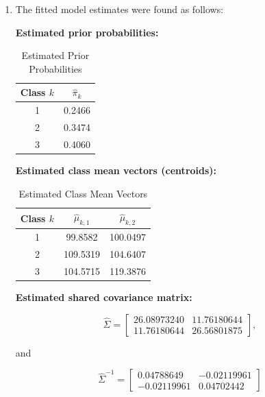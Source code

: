 \begin{enumerate}[label=\roman*.]
    \item The fitted model estimates were found as follows:
    
          \textbf{Estimated prior probabilities:}

          \begin{table}[h]
            \centering
            \caption{Estimated Prior Probabilities}
            \begin{tabular}{cc}
            \hline
            Class $k$ & $\hat{\pi}_k$ \\
            \hline
            1 & 0.2466 \\
            2 & 0.3474 \\
            3 & 0.4060 \\
            \hline
            \end{tabular}
            \label{tab:prior_prob}
          \end{table}

          \newpage

          \textbf{Estimated class mean vectors (centroids):}

          \begin{table}[h]
            \centering
            \caption{Estimated Class Mean Vectors}
            \begin{tabular}{ccc}
            \hline
            Class $k$ & $\hat{\mu}_{k,1}$ & $\hat{\mu}_{k,2}$ \\
            \hline
            1 & 99.8582 & 100.0497 \\
            2 & 109.5319 & 104.6407 \\
            3 & 104.5715 & 119.3876 \\
            \hline
            \end{tabular}
            \label{tab:class_mean_vectors}
          \end{table}

          \textbf{Estimated shared covariance matrix:}

          \[
            \hat{\Sigma}=
            \begin{bmatrix}
            26.08973240 & 11.76180644 \\
            11.76180644 & 26.56801875
            \end{bmatrix},
          \]

          and 

          \[
            \hat{\Sigma}^{-1}=
            \begin{bmatrix}
            0.04788649 & -0.02119961 \\
            -0.02119961 & 0.04702442
            \end{bmatrix}
          \]


\end{enumerate}
